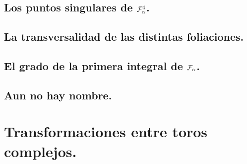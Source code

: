 \documentclass[10pt]{book}
\theoremstyle{definition}
\begin{document}
     	    

  	\section{Los puntos singulares de $\Fol[4]{\alpha}$.}

     	       
     	    
     	    

        \section{La transversalidad de las distintas foliaciones.}

            
        \section{El grado de la primera integral de $\Foli_{\alpha}$.}    
                

        \section{Aun no hay nombre.}
        
\appendix
\chapter{Transformaciones entre toros complejos.}
\label{ApendiceToros}        
            


\end{document}
